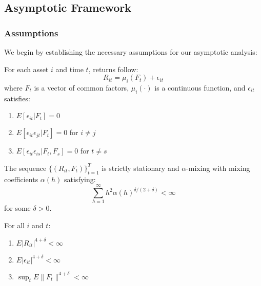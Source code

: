 \subsection{Asymptotic Framework}

\subsubsection{Assumptions}

We begin by establishing the necessary assumptions for our asymptotic analysis:

\begin{assumption}
For each asset $i$ and time $t$, returns follow:
\begin{equation}
    R_{it} = \mu_i(F_t) + \epsilon_{it}
\end{equation}
where $F_t$ is a vector of common factors, $\mu_i(\cdot)$ is a continuous function, and $\epsilon_{it}$ satisfies:
\begin{enumerate}[label=(\alph*)]
    \item $E[\epsilon_{it}|F_t] = 0$
    \item $E[\epsilon_{it}\epsilon_{jt}|F_t] = 0$ for $i \neq j$
    \item $E[\epsilon_{it}\epsilon_{is}|F_t,F_s] = 0$ for $t \neq s$
\end{enumerate}
\end{assumption}

\begin{assumption}
The sequence $\{(R_{it}, F_t)\}_{t=1}^T$ is strictly stationary and $\alpha$-mixing with mixing coefficients $\alpha(h)$ satisfying:
\begin{equation}
    \sum_{h=1}^{\infty} h^2\alpha(h)^{\delta/(2+\delta)} < \infty
\end{equation}
for some $\delta > 0$.
\end{assumption}

\begin{assumption}
For all $i$ and $t$:
\begin{enumerate}[label=(\alph*)]
    \item $E|R_{it}|^{4+\delta} < \infty$
    \item $E|\epsilon_{it}|^{4+\delta} < \infty$
    \item $\sup_t E\|F_t\|^{4+\delta} < \infty$
\end{enumerate}
\end{assumption}

